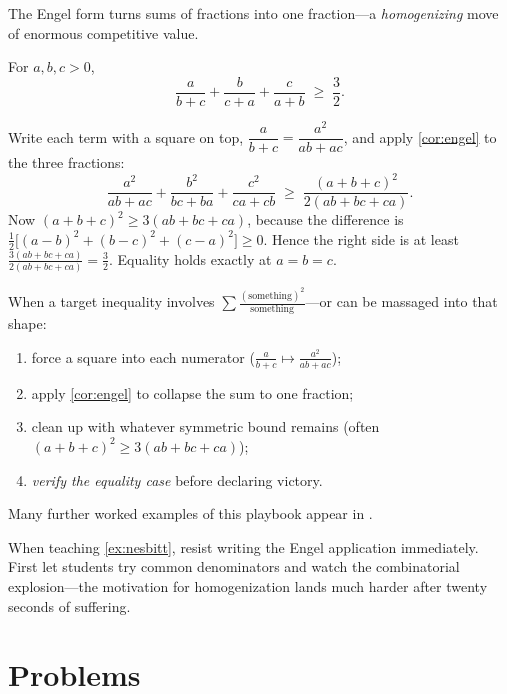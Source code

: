 The Engel form turns sums of fractions into one fraction---a
\emph{homogenizing} move of enormous competitive value.

\begin{example}\label{ex:nesbitt}
For $a, b, c > 0$,
\[
  \frac{a}{b+c} + \frac{b}{c+a} + \frac{c}{a+b} \;\ge\; \frac{3}{2}.
\]

\begin{exsolution}
Write each term with a square on top,
$\dfrac{a}{b+c} = \dfrac{a^2}{ab+ac}$, and apply \cref{cor:engel} to
the three fractions:
\[
  \frac{a^2}{ab+ac} + \frac{b^2}{bc+ba} + \frac{c^2}{ca+cb}
  \;\ge\;
  \frac{(a+b+c)^2}{2(ab+bc+ca)} .
\]
Now $(a+b+c)^2 \ge 3(ab+bc+ca)$, because the difference is
$\tfrac{1}{2}\big[(a-b)^2 + (b-c)^2 + (c-a)^2\big] \ge 0$. Hence the
right side is at least
$\tfrac{3(ab+bc+ca)}{2(ab+bc+ca)} = \tfrac{3}{2}$. Equality holds
exactly at $a = b = c$.
\end{exsolution}
\end{example}

\begin{strategy}\label{str:engel}
When a target inequality involves $\sum \frac{(\text{something})^2}
{\text{something}}$---or can be massaged into that shape:
\begin{enumerate}[label=\arabic*., itemsep=2pt]
  \item force a square into each numerator
        ($\frac{a}{b+c} \mapsto \frac{a^2}{ab+ac}$);
  \item apply \cref{cor:engel} to collapse the sum to one fraction;
  \item clean up with whatever symmetric bound remains
        (often $(a+b+c)^2 \ge 3(ab+bc+ca)$);
  \item \emph{verify the equality case} before declaring victory.
\end{enumerate}
Many further worked examples of this playbook appear in
\cite{andreescu2000, kedlaya1999}.
\end{strategy}

\ifstudent\else
\begin{instructornote}
When teaching \cref{ex:nesbitt}, resist writing the Engel application
immediately. First let students try common denominators and watch the
combinatorial explosion---the motivation for homogenization lands much
harder after twenty seconds of suffering.
\end{instructornote}
\fi

\section{Problems}
\label{sec:problems-1}

